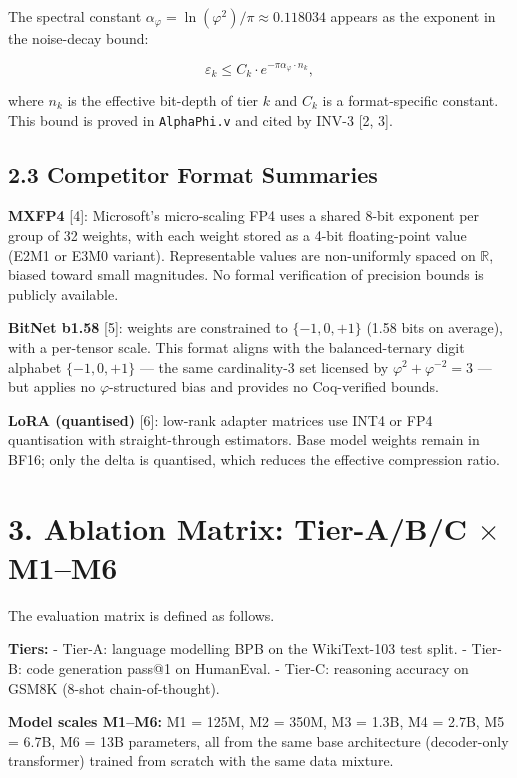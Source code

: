 The spectral constant
\(\alpha_\varphi = \ln(\varphi^2)/\pi \approx 0.118034\)
appears as the exponent in the noise-decay bound:

\[\varepsilon_k \leq C_k \cdot e^{-\pi \alpha_\varphi \cdot n_k},\]

where \(n_k\) is the effective bit-depth of tier
\(k\) and \(C_k\) is a format-specific constant.
This bound is proved in \texttt{AlphaPhi.v} and
cited by INV-3 [2, 3].

\subsection{2.3 Competitor Format
Summaries}\label{fa_09:competitor-format-summaries}

\textbf{MXFP4} [4]: Microsoft's micro-scaling
FP4 uses a shared 8-bit exponent per group of 32
weights, with each weight stored as a 4-bit
floating-point value (E2M1 or E3M0 variant).
Representable values are non-uniformly spaced on
\(\mathbb{R}\), biased toward small magnitudes. No
formal verification of precision bounds is
publicly available.

\textbf{BitNet b1.58} [5]: weights are
constrained to \(\{-1, 0, +1\}\) (1.58 bits on
average), with a per-tensor scale. This format
aligns with the balanced-ternary digit alphabet
\(\{-1, 0, +1\}\) --- the same cardinality-3 set
licensed by \(\varphi^2 + \varphi^{-2} = 3\) ---
but applies no \(\varphi\)-structured bias and
provides no Coq-verified bounds.

\textbf{LoRA (quantised)} [6]: low-rank
adapter matrices use INT4 or FP4 quantisation with
straight-through estimators. Base model weights
remain in BF16; only the delta is quantised, which
reduces the effective compression ratio.

\section{3. Ablation Matrix: Tier-A/B/C $\times$
M1--M6}\label{fa_09:ablation-matrix-tier-abc-m1m6}

The evaluation matrix is defined as follows.

\textbf{Tiers:} - Tier-A: language modelling BPB
on the WikiText-103 test split. - Tier-B: code
generation pass@1 on HumanEval. - Tier-C:
reasoning accuracy on GSM8K (8-shot
chain-of-thought).

\textbf{Model scales M1--M6:} M1 = 125M, M2 =
350M, M3 = 1.3B, M4 = 2.7B, M5 = 6.7B, M6 = 13B
parameters, all from the same base architecture
(decoder-only transformer) trained from scratch
with the same data mixture.

